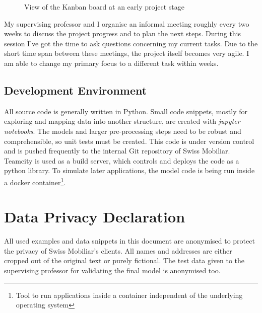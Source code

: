 \begin{figure}[!ht]
\centering
{}
\caption{View of the Kanban board at an early project stage}
\label{fig:kanban}
\end{figure}

My supervising professor and I organise an informal meeting roughly every two weeks to discuss the project progress and to plan the next steps. During this session I've got the time to ask questions concerning my current tasks. Due to the short time span between these meetings, the project itself becomes very agile. I am able to change my primary focus to a different task within weeks.

\subsection{Development Environment}

All source code is generally written in Python. Small code snippets, mostly for exploring and mapping data into another structure, are created with \emph{jupyter notebooks}. The models and larger pre-processing steps need to be robust and comprehensible, so unit tests must be created. This code is under version control and is pushed frequently to the internal Git repository of Swiss Mobiliar. Teamcity is used as a build server, which controls and deploys the code as a python library. To simulate later applications, the model code is being run inside a docker container\footnote{Tool to run applications inside a container independent of the underlying operating system}.

\section{Data Privacy Declaration}

All used examples and data snippets in this document are anonymised to protect the privacy of Swiss Mobiliar's clients. All names and addresses are either cropped out of the original text or purely fictional. The test data given to the supervising professor for validating the final model is anonymised too.
